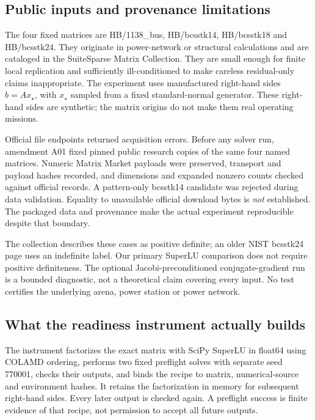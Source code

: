\documentclass[11pt,a4paper]{article}
\begin{document}
\subsection{Public inputs and provenance limitations}
The four fixed matrices are HB/1138\_bus, HB/bcsstk14, HB/bcsstk18 and HB/bcsstk24. They originate in power-network or structural calculations and are cataloged in the SuiteSparse Matrix Collection. \citep{davis2011,kolodziej2019} They are small enough for finite local replication and sufficiently ill-conditioned to make careless residual-only claims inappropriate. The experiment uses manufactured right-hand sides $b=Ax_\star$, with $x_\star$ sampled from a fixed standard-normal generator. These right-hand sides are synthetic; the matrix origins do not make them real operating missions.

Official file endpoints returned acquisition errors. Before any solver run, amendment A01 fixed pinned public research copies of the same four named matrices. Numeric Matrix Market payloads were preserved, transport and payload hashes recorded, and dimensions and expanded nonzero counts checked against official records. A pattern-only bcsstk14 candidate was rejected during data validation. Equality to unavailable official download bytes is \emph{not} established. The packaged data and provenance make the actual experiment reproducible despite that boundary.

The collection describes these cases as positive definite; an older NIST bcsstk24 page uses an indefinite label. Our primary SuperLU comparison does not require positive definiteness. The optional Jacobi-preconditioned conjugate-gradient run is a bounded diagnostic, not a theoretical claim covering every input. No test certifies the underlying arena, power station or power network.

\subsection{What the readiness instrument actually builds}
The instrument factorizes the exact matrix with SciPy SuperLU in float64 using COLAMD ordering, performs two fixed preflight solves with separate seed 770001, checks their outputs, and binds the recipe to matrix, numerical-source and environment hashes. \citep{scipySplu} It retains the factorization in memory for subsequent right-hand sides. Every later output is checked again. A preflight success is finite evidence of that recipe, not permission to accept all future outputs.
\end{document}
